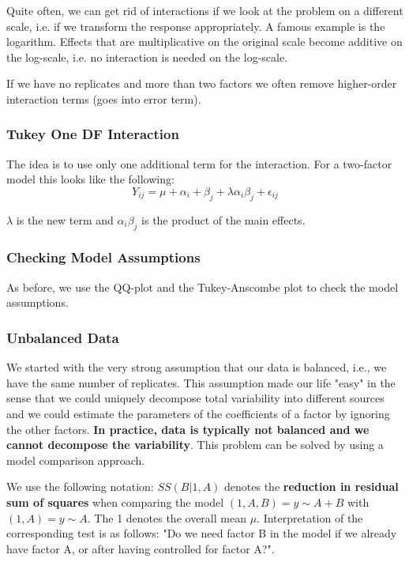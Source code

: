 Quite often, we can get rid of interactions if we look at the problem on a different scale, i.e. if we transform the response appropriately. A famous example is the logarithm. Effects that are multiplicative on the original scale become additive on the log-scale, i.e. no interaction is needed on the log-scale.\medskip

If we have no replicates and more than two factors we often remove higher-order interaction terms (goes into error term).

\subsubsection{Tukey One DF Interaction}

The idea is to use only one additional term for the interaction. For a two-factor model this looks like the following:
$$Y_{ij} = \mu + \alpha_i + \beta_j + \lambda \alpha_i \beta_j + \epsilon_{ij}$$

$\lambda$ is the new term and $\alpha_i \beta_j$ is the product of the main effects.

\subsubsection{Checking Model Assumptions}

As before, we use the QQ-plot and the Tukey-Anscombe plot to check the model assumptions.

\subsubsection{Unbalanced Data}

We started with the very strong assumption that our data is balanced, i.e., we have the same number of replicates. This assumption made our life "easy" in the sense that we could uniquely decompose total variability into different sources and we could estimate the parameters of the coefficients of a factor by ignoring the other factors. \textbf{In practice, data is typically not balanced and we cannot decompose the variability}. This problem can be solved by using a model comparison approach. \medskip

We use the following notation: $SS( B | 1, A)$ denotes the \textbf{reduction in residual sum of squares} when comparing the model $(1, A, B) = y \sim A + B$ with $(1, A) = y \sim A$. The 1 denotes the overall mean $\mu$. Interpretation of the corresponding test is as follows: "Do we need factor B in the model if we already have factor A, or after having controlled for factor A?". \medskip

